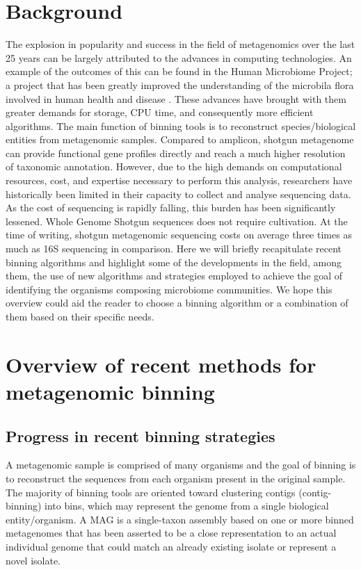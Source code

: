 \documentclass{article}
\begin{document}
\section{Background}
The explosion in popularity and success in the field of metagenomics over the last 25 years can be largely attributed to the advances in computing technologies.
An example of the outcomes of this can be found in the Human Microbiome Project; a project that has been greatly improved the understanding of the microbila flora involved in human health and disease \cite{turnbaugh2007human}.
These advances have brought with them greater demands for storage, CPU time, and consequently more efficient algorithms.
The main function of binning tools is to reconstruct species/biological entities from metagenomic samples.  
Compared to amplicon, shotgun metagenome can provide functional gene profiles directly and reach a much higher resolution of taxonomic annotation.
However, due to the high demands on computational resources, cost, and expertise necessary to perform this analysis, researchers have historically been limited in their capacity to collect and analyse sequencing data.
As the cost of sequencing is rapidly falling, this burden has been significantly lessened.
Whole Genome Shotgun sequences does not require cultivation.
At the time of writing, shotgun metagenomic sequencing costs on average three times as much as 16S sequencing in comparison.
Here we will briefly recapitulate recent binning algorithms and highlight some of the developments in the field, among them, the use of new algorithms and strategies employed to achieve the goal of identifying the organisms composing microbiome communities.
We hope this overview could aid the reader to choose a binning algorithm or a combination of them based on their specific needs.

\section{Overview of recent methods for metagenomic binning}
\subsection{Progress in recent binning strategies}
A metagenomic sample is comprised of many organisms and the goal of binning is to reconstruct the sequences from each organism present in the original sample.
The majority of binning tools are oriented toward clustering contigs (contig-binning) into bins, which may represent the genome from a single biological entity/organism.
A \gls{MAG} is a single-taxon assembly based on one or more binned metagenomes that has been asserted to be a close representation to an actual individual genome that could match an already existing isolate or represent a novel isolate.
\end{document}
